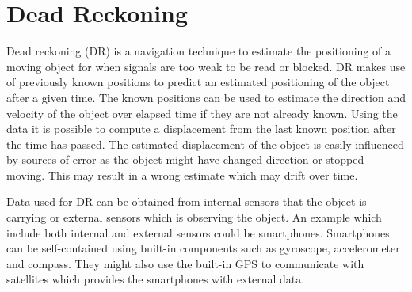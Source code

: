 \section{Dead Reckoning}
Dead reckoning (DR) \cite{DR} is a navigation technique to estimate the positioning of a moving object for when signals are too weak to be read or blocked.
DR makes use of previously known positions to predict an estimated positioning of the object after a given time.
The known positions can be used to estimate the direction and velocity of the object over elapsed time if they are not already known.
Using the data it is possible to compute a displacement from the last known position after the time has passed.
The estimated displacement of the object is easily influenced by sources of error as the object might have changed direction or stopped moving.
This may result in a wrong estimate which may drift over time.

Data used for DR can be obtained from internal sensors that the object is carrying or external sensors which is observing the object.
An example which include both internal and external sensors could be smartphones.
Smartphones can be self-contained using built-in components such as gyroscope, accelerometer and compass.
They might also use the built-in GPS to communicate with satellites which provides the smartphones with external data.